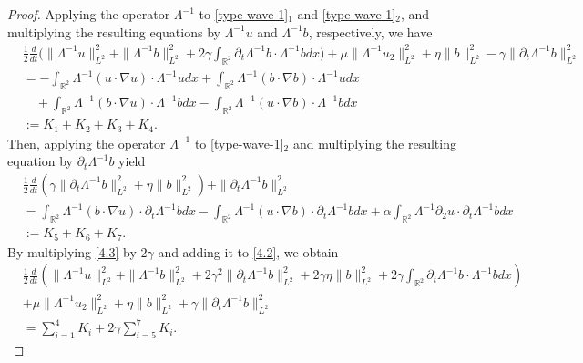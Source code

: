 \documentclass[reqno,11pt]{amsart}
\def\R{\mathbb R}
\numberwithin{Thm}{section}
\begin{document}
\begin{proof}
Applying the operator $\Lambda^{-1}$ to \eqref{type-wave-1}$_1$ and \eqref{type-wave-1}$_2$, and multiplying the resulting equations by $\Lambda^{-1}u$ and $\Lambda^{-1}b$, respectively, we have
\begin{align}\label{4.2}
&\frac{1}{2}\frac{d}{dt}\big(\|\Lambda^{-1}u\|^2_{L^2}+\|\Lambda^{-1}b\|^2_{L^2}+2\gamma\int_{\R^2}\partial_t\Lambda^{-1}b\cdot\Lambda^{-1}bdx\big)+\mu\|\Lambda^{-1}u_2\|^2_{L^2}+\eta\|b\|^2_{L^2}-\gamma\|\partial_t\Lambda^{-1}b\|^2_{L^2}\nonumber\\
&=-\int_{\R^2}\Lambda^{-1}(u\cdot\nabla u)\cdot\Lambda^{-1}udx+\int_{\R^2}\Lambda^{-1}(b\cdot\nabla b)\cdot\Lambda^{-1}udx\nonumber\\
&\quad +\int_{\R^2}\Lambda^{-1}(b\cdot\nabla u)\cdot\Lambda^{-1}bdx-\int_{\R^2}\Lambda^{-1}(u\cdot \nabla b)\cdot\Lambda^{-1}bdx\nonumber\\
&:=K_1+K_2+K_3+K_4.
\end{align}
Then, applying the operator $\Lambda^{-1}$ to \eqref{type-wave-1}$_2$ and multiplying the resulting equation by $\partial_t\Lambda^{-1}b$ yield
\begin{align}\label{4.3}
&\frac{1}{2}\frac{d}{dt}(\gamma\|\partial_t\Lambda^{-1}b\|^2_{L^2}+\eta\|b\|^2_{L^2})+\|\partial_t\Lambda^{-1}b\|^2_{L^2}\nonumber\\
&=\int_{\R^2}\Lambda^{-1}(b\cdot\nabla u)\cdot\partial_t\Lambda^{-1}bdx-\int_{\R^2}\Lambda^{-1}(u\cdot\nabla b)\cdot\partial_t\Lambda^{-1}bdx+\alpha\int_{\R^2}\Lambda^{-1}\partial_2u\cdot\partial_t\Lambda^{-1}bdx\nonumber\\
&:=K_5+K_6+K_7.
\end{align}
By multiplying \eqref{4.3} by $2\gamma$ and adding it to \eqref{4.2}, we obtain
\begin{align}\label{4.4}
&\frac{1}{2}\frac{d}{dt}\left(\|\Lambda^{-1} u\|^2_{L^2}+\|\Lambda^{-1} b\|^2_{L^2}+2\gamma^2\|\partial_t\Lambda^{-1}b\|^2_{L^2}
+2\gamma\eta\|b\|^2_{L^2}+2\gamma\int_{\R^2}\partial_t\Lambda^{-1}b\cdot\Lambda^{-1}bdx
\right)\nonumber\\
&+\mu\|\Lambda^{-1}u_2\|^2_{L^2}+\eta\|b\|^2_{L^2}+\gamma\|\partial_t\Lambda^{-1}b\|^2_{L^2}\nonumber\\
&=\sum_{i=1}^{4}K_i+2\gamma\sum_{i=5}^{7}K_i.
\end{align}



\end{proof}
\end{document}

